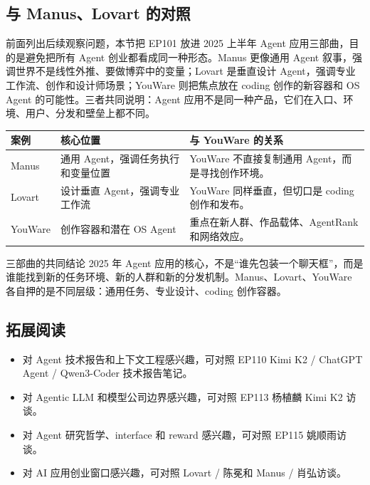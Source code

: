 \documentclass[a4paper]{article}
\begin{document}
\subsection{与 Manus、Lovart 的对照}

前面列出后续观察问题，本节把 EP101 放进 2025 上半年 Agent 应用三部曲，目的是避免把所有 Agent 创业都看成同一种形态。Manus 更像通用 Agent 叙事，强调世界不是线性外推、要做博弈中的变量；Lovart 是垂直设计 Agent，强调专业工作流、创作和设计师场景；YouWare 则把焦点放在 coding 创作的新容器和 OS Agent 的可能性。三者共同说明：Agent 应用不是同一种产品，它们在入口、环境、用户、分发和壁垒上都不同。

\noindent\begin{tabularx}{\textwidth}{p{}p{}X}
\toprule
案例 & 核心位置 & 与 YouWare 的关系 \\
\midrule
Manus & 通用 Agent，强调任务执行和变量位置 & YouWare 不直接复制通用 Agent，而是寻找创作环境。 \\
Lovart & 设计垂直 Agent，强调专业工作流 & YouWare 同样垂直，但切口是 coding 创作和发布。 \\
YouWare & 创作容器和潜在 OS Agent & 重点在新人群、作品载体、AgentRank 和网络效应。 \\
\bottomrule
\end{tabularx}

\begin{importantbox}{三部曲的共同结论}
2025 年 Agent 应用的核心，不是“谁先包装一个聊天框”，而是谁能找到新的任务环境、新的人群和新的分发机制。Manus、Lovart、YouWare 各自押的是不同层级：通用任务、专业设计、coding 创作容器。
\end{importantbox}

\subsection{拓展阅读}

\begin{itemize}
\item 对 Agent 技术报告和上下文工程感兴趣，可对照 EP110 Kimi K2 / ChatGPT Agent / Qwen3-Coder 技术报告笔记。
\item 对 Agentic LLM 和模型公司边界感兴趣，可对照 EP113 杨植麟 Kimi K2 访谈。
\item 对 Agent 研究哲学、interface 和 reward 感兴趣，可对照 EP115 姚顺雨访谈。
\item 对 AI 应用创业窗口感兴趣，可对照 Lovart / 陈冕和 Manus / 肖弘访谈。
\end{itemize}
\end{document}
